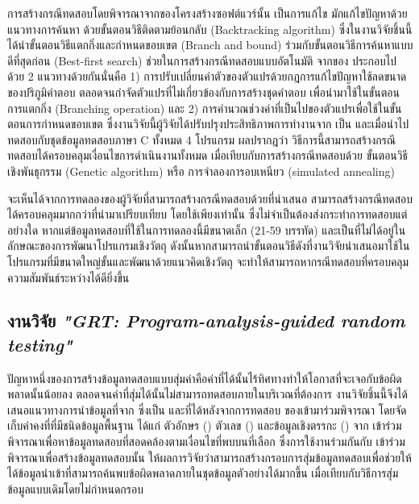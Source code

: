 การสร้างกรณีทดสอบโดยพิจารณาจาก{\Path}ของโครงสร้างซอฟต์แวร์นั้น เป็นการแก้ไข\FirstTimeDefine{\csp}{\cspEN} มักแก้ไขปัญหาด้วยแนวทางการค้นหา
ด้วยขั้นตอนวิธีติดตามย้อนกลับ (Backtracking algorithm) ซึ่งในงานวิจัยชิ้นนี้ได้นำขั้นตอนวิธีแตกกิ่งและกำหนดขอบเขต (Branch and bound) 
ร่วมกับขั้นตอนวิธีการค้นหาแบบดีที่สุดก่อน (Best-first search) ช่วยในการสร้างกรณีทดสอบแบบอัตโนมัติ จาก{\StaticInformation}ของ{\sourcecode} 
ประกอบไปด้วย 2 แนวทางด้วยกันนั่นคือ 
1) การปรับเปลี่ยนค่าตัวของตัวแปรด้วยกฎการแก้ไขปัญหาใช้ลดขนาดของปริภูมิคำตอบ ตลอดจนกำจัดตัวแปรที่ไม่เกี่ยวข้องกับการสร้างชุดคำตอบ 
เพื่อนำมาใช้ในขั้นตอนการแตกกิ่ง (Branching operation) และ 2) การคำนวณช่วงค่าที่เป็นไปของตัวแปรเพื่อใช้ในขั้นตอนการกำหนดขอบเขต
ซึ่งงานวิจัยนี้ผู้วิจัยได้ปรับปรุงประสิทธิภาพการทำงานจาก  เป็น  และเมื่อนำไปทดสอบกับชุดข้อมูลทดสอบภาษา C ทั้งหมด 4 โปรแกรม
ผลปรากฎว่า วิธีการนี้สามารถสร้างกรณีทดสอบได้ครอบคลุมเงื่อนไขการดำเนินงานทั้งหมด เมื่อเทียบกับการสร้างกรณีทดสอบด้วย ขั้นตอนวิธีเชิงพันธุกรรม (Genetic algorithm)
หรือ การจำลองการอบเหนียว (simulated annealing) %

จะเห็นได้จากการทดลองของผู้วิจัยที่สามารถสร้างกรณีทดสอบด้วย{\Algorithm}ที่นำเสนอ สามารถสร้างกรณีทดสอบได้ครอบคลุมมากกว่า{\Algorithm}ที่นำมาเปรียบเทียบ 
โดยใช้เพียง{\StaticInformation}เท่านั้น ซึ่งไม่จำเป็นต้องส่งกระทำการทดสอบ{\sourcecode}แต่อย่างใด หากแต่ข้อมูลทดสอบที่ใช้ในการทดลองนี้มีขนาดเล็ก 
(21-59 บรรทัด) และเป็น{\sourcecode}ที่ไม่ได้อยู่ในลักษณะของการพัฒนาโปรแกรมเชิงวัตถุ 
ดังนั้นหากสามารถนำขั้นตอนวิธีดังที่งานวิจัยนำเสนอมาใช้ในโปรแกรมที่มีขนาดใหญ่ขั้นและพัฒนาด้วยแนวคิดเชิงวัตถุ 
จะทำให้สามารถหากรณีทดสอบที่ครอบคลุมความสัมพันธ์ระหว่าง{\softwareComponent}ได้ดียิ่งขึ้น

\subsection{งานวิจัย {\it "GRT: Program-analysis-guided random testing"} \cite{Ma2016}}
\label{sec:sub:grt}

ปัญหาหนึ่งของการสร้างข้อมูลทดสอบแบบสุ่มค่าคือค่าที่ได้นั้นไร้ทิศทางทำให้โอกาสที่จะเจอกับข้อผิดพลาดนั้นน้อยลง 
ตลอดจนค่าที่สุ่มได้นั้นไม่สามารถทดสอบ{\sourcecode}ภายในบริเวณที่ต้องการ งานวิจัยชิ้นนี้จึงได้เสนอแนวทางการนำข้อมูลที่จาก{\sourcecode}
ซึ่งเป็น{\StaticInformation} และ{\DynamicInformation}ที่ได้หลังจากการทดสอบ{\software} 
ของ{\SUT}เข้ามาร่วมพิจารณา โดยจัดเก็บค่าคงที่ที่มีชนิดข้อมูลพื้นฐาน ได้แก่ ตัวอักษร () ตัวเลข () 
และข้อมูลเชิงตรรกะ () จาก{\sourcecode} เข้าร่วมพิจารณาเพื่อหาข้อมูลทดสอบที่สอดคล้องตามเงื่อนไขที่พบบน{\TestPath}ที่เลือก 
ซึ่งการใช้งาน{\StaticInformation}ร่วมกันกับ{\DynamicInformation} เข้าร่วมพิจารณาเพื่อสร้างข้อมูลทดสอบนั้น 
ให้ผลการวิจัยว่าสามารถสร้างกรอบการสุ่มข้อมูลทดสอบเพื่อช่วยให้ ได้ข้อมูลนำเข้าที่สามารถค้นพบข้อผิดพลาดภายในชุดข้อมูลตัวอย่างได้มากขึ้น 
เมื่อเทียบกับวิธีการสุ่มข้อมูลแบบเดิมโดยไม่กำหนดกรอบ

